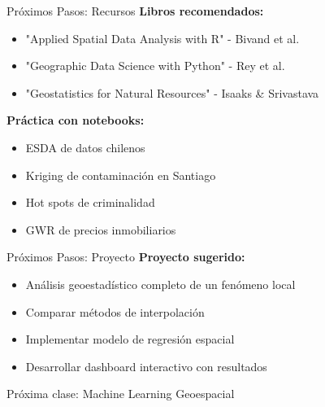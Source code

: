 \documentclass[10pt,aspectratio=169]{beamer}
\newcommand{\alertbox}[1]{
\begin{tcolorbox}[colframe=red!70,colback=red!5]
\centering\faExclamationTriangle\space #1
\end{tcolorbox}
}
\begin{document}
\begin{frame}{Próximos Pasos: Recursos}
    \textbf{\faBook\space Libros recomendados:}
    \begin{itemize}
        \item "Applied Spatial Data Analysis with R" - Bivand et al.
        \item "Geographic Data Science with Python" - Rey et al.
        \item "Geostatistics for Natural Resources" - Isaaks \& Srivastava
    \end{itemize}
    
    \vspace{0.5cm}
    \textbf{\faCode\space Práctica con notebooks:}
    \begin{itemize}
        \item ESDA de datos chilenos
        \item Kriging de contaminación en Santiago
        \item Hot spots de criminalidad
        \item GWR de precios inmobiliarios
    \end{itemize}
\end{frame}

\begin{frame}{Próximos Pasos: Proyecto}
    \textbf{\faRocket\space Proyecto sugerido:}
    \begin{itemize}
        \item Análisis geoestadístico completo de un fenómeno local
        \item Comparar métodos de interpolación
        \item Implementar modelo de regresión espacial
        \item Desarrollar dashboard interactivo con resultados
    \end{itemize}
    
    \vspace{1cm}
    \alertbox{Próxima clase: Machine Learning Geoespacial}
\end{frame}
\end{document}
